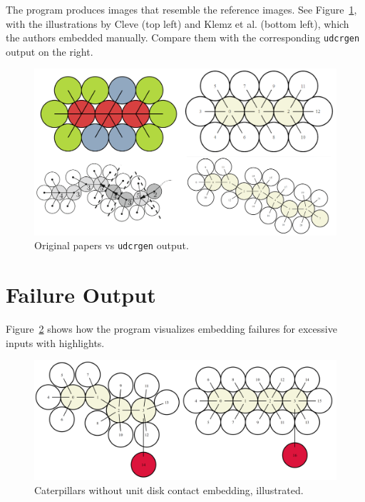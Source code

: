 \documentclass[draft,final]{vutinfth} %
\begin{document}
The program produces images that resemble the reference images. See Figure~\ref{fig:visual_comparison}, with the illustrations by Cleve \cite{Cleve2020} (top left) and Klemz et al. \cite{Klemz2015} (bottom left), which the authors embedded manually. Compare them with the corresponding \texttt{udcrgen} output on the right. 

\begin{figure}
    \centering
    \includegraphics[width=\textwidth]{graphics/visual_comparison.png}
    \caption{Original papers vs \texttt{udcrgen} output.}
    \label{fig:visual_comparison}
\end{figure}

\section{Failure Output}

Figure~\ref{fig:failure} shows how the program visualizes embedding failures for excessive inputs with highlights.

\begin{figure}
    \centering
    \includegraphics[width=\textwidth]{graphics/failure.png}
    \caption{Caterpillars without unit disk contact embedding, illustrated.}
    \label{fig:failure}
\end{figure}
\end{document}
